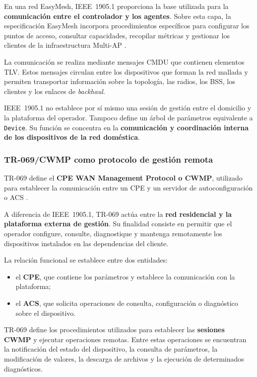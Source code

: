 En una red EasyMesh, IEEE~1905.1 proporciona la base utilizada para la
\textbf{comunicación entre el controlador y los agentes}. Sobre esta
capa, la especificación EasyMesh incorpora procedimientos específicos
para configurar los puntos de acceso, consultar capacidades, recopilar
métricas y gestionar los clientes de la infraestructura Multi-AP
\cite{wifi_alliance_easymesh,ieee_1905_1}.

La comunicación se realiza mediante mensajes CMDU que contienen
elementos TLV. Estos mensajes circulan entre los dispositivos que forman
la red mallada y permiten transportar información sobre la topología,
las radios, los BSS, los clientes y los enlaces de
\textit{backhaul}.

IEEE~1905.1 no establece por sí mismo una sesión de gestión entre el
domicilio y la plataforma del operador. Tampoco define un árbol de
parámetros equivalente a \texttt{Device}. Su función se concentra en la
\textbf{comunicación y coordinación interna de los dispositivos de la
red doméstica}.


\subsubsection*{TR-069/CWMP como protocolo de gestión remota}

TR-069 define el
\textbf{CPE WAN Management Protocol o CWMP}, utilizado para establecer la
comunicación entre un CPE y un servidor de autoconfiguración o ACS
\cite{bbf_tr069}.

A diferencia de IEEE~1905.1, TR-069 actúa entre la
\textbf{red residencial y la plataforma externa de gestión}. Su finalidad
consiste en permitir que el operador configure, consulte, diagnostique y
mantenga remotamente los dispositivos instalados en las dependencias del
cliente.

La relación funcional se establece entre dos entidades:

\begin{itemize}
    \item el \textbf{CPE}, que contiene los parámetros y establece la
    comunicación con la plataforma;

    \item el \textbf{ACS}, que solicita operaciones de consulta,
    configuración o diagnóstico sobre el dispositivo.
\end{itemize}

TR-069 define los procedimientos utilizados para establecer las
\textbf{sesiones CWMP} y ejecutar operaciones remotas. Entre estas
operaciones se encuentran la notificación del estado del dispositivo, la
consulta de parámetros, la modificación de valores, la descarga de
archivos y la ejecución de determinados diagnósticos.

